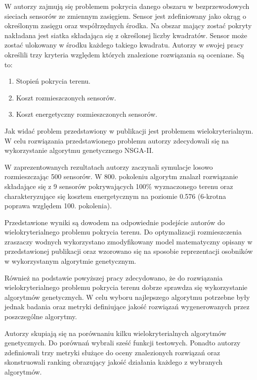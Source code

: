 \documentclass[twoside]{iisthesis}
\begin{document}
W \cite{sensors} autorzy zajmują się problemem pokrycia danego obszaru w bezprzewodowych sieciach sensorów ze zmiennym zasięgiem. Sensor jest zdefiniowany jako okrąg o określonym zasięgu oraz współrzędnych środka. Na obszar mający zostać pokryty nakładana jest siatka składająca się z określonej liczby kwadratów. Sensor może zostać ulokowany w środku każdego takiego kwadratu. Autorzy w swojej pracy określili trzy kryteria względem których znalezione rozwiązania są oceniane. Są to:\\
\begin{enumerate}
	\item Stopień pokrycia terenu.
	\item Koszt rozmieszczonych sensorów.
	\item Koszt energetyczny rozmieszczonych sensorów.\\
\end{enumerate}
Jak widać problem przedstawiony w publikacji jest problemem wielokryterialnym. W celu rozwiązania przedstawionego problemu autorzy zdecydowali się na wykorzystanie algorytmu genetycznego NSGA-II.

W zaprezentowanych rezultatach autorzy zaczynali symulacje losowo rozmieszczając 500 sensorów. W 800. pokoleniu algorytm znalazł rozwiązanie składające się z 9 sensorów pokrywających 100\% wyznaczonego terenu oraz charakteryzujące się kosztem energetycznym na poziomie 0.576 (6-krotna poprawa względem 100. pokolenia).

Przedstawione wyniki są dowodem na odpowiednie podejście autorów do wielokryterialnego problemu pokrycia terenu. Do optymalizacji rozmieszczenia zraszaczy wodnych wykorzystano zmodyfikowany model matematyczny opisany w przedstawionej publikacji oraz wzorowano się na sposobie reprezentacji osobników w wykorzystanym algorytmie genetycznym.

Również na podstawie powyższej pracy zdecydowano, że do rozwiązania wielokryterialnego problemu pokrycia terenu dobrze sprawdza się wykorzystanie algorytmów genetycznych. W celu wyboru najlepszego algorytmu potrzebne były jednak badania oraz metryki definiujące jakość rozwiązań wygenerowanych przez poszczególne algorytmy.

Autorzy \cite{comparison_deb} skupiają się na porównaniu kilku wielokryterialnych algorytmów genetycznych. Do porównań wybrali sześć funkcji testowych. Ponadto autorzy zdefiniowali trzy metryki służące do oceny znalezionych rozwiązań oraz skonstruowali ranking obrazujący jakość działania każdego z wybranych algorytmów.
\end{document}
